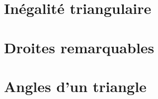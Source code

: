 \documentclass[12pt,a4paper]{article}
\date{}
\title{}
\begin{document}







\section{Inégalité triangulaire}





\section{Droites remarquables}



\section{Angles d'un triangle}


\end{document}
